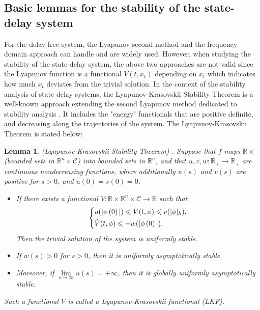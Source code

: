 \documentclass[a4paper]{cas-sc}
\newtheorem{lemma}[theorem]{Lemma}
\begin{document}
\subsection{Basic lemmas for the stability of the state-delay system}
\label{Section 2.2}

For the delay-free system, the Lyapunov second method and the frequency domain approach can handle and are widely used. However, when studying the stability of the state-delay system, the above two approaches are not valid since the Lyapunov function is a functional $V(t,x_t)$ depending on $x_t$ which indicates how much $x_t$ deviates from the trivial solution. In the context of the stability analysis of state delay systems, the Lyapunov-Krasovskii Stability Theorem is a well-known approach extending the second Lyapunov method dedicated to stability analysis \citep{gu2001further}. It includes the "energy" functionals that are positive definite, and decreasing along the trajectories of the system. The Lyapunov-Krasovskii Theorem is stated below:
\begin{lemma}
  \label{lemma1}
  (Lyapunov-Krasovskii Stability Theorem) \citep{gu2003stability}. Suppose that $f$ maps $\mathbb{R} \times  $(bounded sets in ${\mathbb{R}^n} \times \mathcal{C} $) into bounded sets in ${\mathbb{R}^n} $, and that $u,v,w:{\mathbb{R}_ + } \to {\mathbb{R}_ + } $ are continuous nondecreasing functions, where additionally $u(s) $ and $v(s) $ are positive for $s > 0 $, and $u(0) = v(0) = 0 $.
  \begin{itemize}
    \item If there exists a functional $V:\mathbb{R} \times {\mathbb{R}^n} \times \mathcal{C} \to \mathbb{R} $ such that
          \begin{equation}
            \left\{ \begin{gathered}
              u(|\phi \left( 0 \right)|) \leqslant V(t,\phi ) \leqslant v(|\phi {|_h}) \hfill, \\
              \dot V(t,\phi ) \leqslant  - w(|\phi \left( 0 \right)|). \hfill \\
            \end{gathered}  \right.
            \label{eq15}
          \end{equation}
          Then the trivial solution of the system is uniformly stable.

    \item If $w(s) > 0 $ for $s > 0 $, then it is uniformly asymptotically stable.
    \item Moreover, if $\mathop {\lim }\limits_{s \to \infty } u(s) =  + \infty  $, then it is globally uniformly asymptotically stable.
  \end{itemize}

  Such a functional $V $ is called a Lyapunov-Krasovskii functional (LKF).
\end{lemma}
\end{document}
